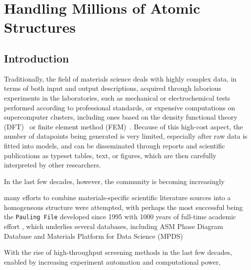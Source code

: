 \chapter{Handling Millions of Atomic Structures} \label{chap:mpdd}



\section{Introduction} \label{mpdd:sec:background}

Traditionally, the field of materials science deals with highly complex data, in terms of both input and output descriptions, acquired through laborious experiments in the laboratories, such as mechanical or electrochemical tests performed according to professional standards, or expensive computations on supercomputer clusters, including ones based on the density functional theory (DFT)~\cite{Kohn1996DensityStructure} or finite element method (FEM)~\cite{Liu2022EightyFuture}. Because of this high-cost aspect, the number of datapoints being generated is very limited, especially after raw data is fitted into models, and can be disseminated through reports and scientific publications as typeset tables, text, or figures, which are then carefully interpreted by other researchers.

In the last few decades, however, the community is becoming increasingly 


many efforts to combine materials-specific scientific literature sources into a homogeneous structure were attempted, with perhaps the most successful being the \texttt{Pauling File} developed since 1995 with 1000 years of full-time academic effort \cite{Blokhin2018TheGenome}, which underlies several databases, including ASM Phase Diagram Database \cite{ASMInternational} and Materials Platform for Data Science (MPDS) 



With the rise of high-throughput screening methods in the last few decades, enabled by increasing experiment automation and computational power, 

